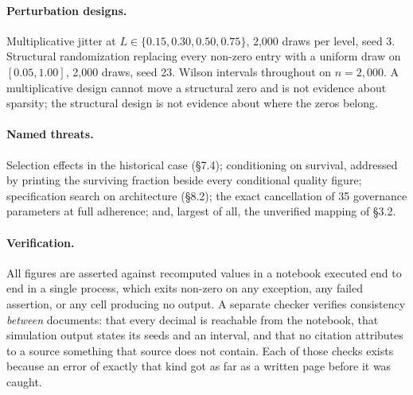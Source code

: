 \documentclass[11pt,a4paper]{article}
\begin{document}
\paragraph{Perturbation designs.} Multiplicative jitter at
$L \in \{0.15, 0.30, 0.50, 0.75\}$, 2,000 draws per level, seed 3. Structural
randomization replacing every non-zero entry with a uniform draw on $[0.05, 1.00]$,
2,000 draws, seed 23. Wilson intervals throughout on $n = 2{,}000$. A
multiplicative design cannot move a structural zero and is not evidence about
sparsity; the structural design is not evidence about where the zeros belong.

\paragraph{Named threats.} Selection effects in the historical case (\S7.4);
conditioning on survival, addressed by printing the surviving fraction beside
every conditional quality figure; specification search on architecture (\S8.2);
the exact cancellation of 35 governance parameters at full adherence; and, largest
of all, the unverified mapping of \S3.2.

\paragraph{Verification.} All figures are asserted against recomputed values in a
notebook executed end to end in a single process, which exits non-zero on any
exception, any failed assertion, or any cell producing no output. A separate
checker verifies consistency \emph{between} documents: that every decimal is
reachable from the notebook, that simulation output states its seeds and an
interval, and that no citation attributes to a source something that source does
not contain. Each of those checks exists because an error of exactly that kind got
as far as a written page before it was caught.
\end{document}
